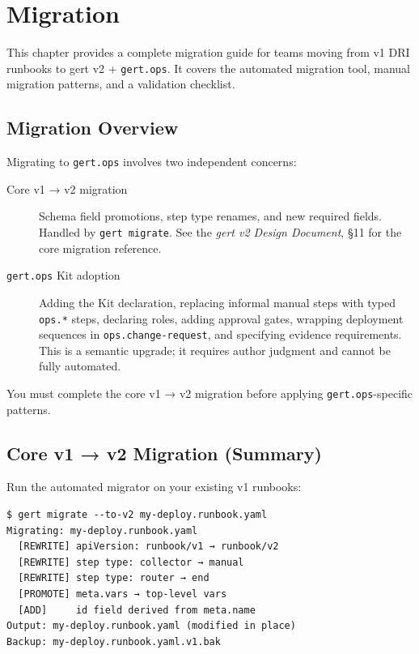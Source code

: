 \chapter{Migration}
\label{ch:migration}

This chapter provides a complete migration guide for teams moving from v1 DRI runbooks to
gert v2 + \texttt{gert.ops}. It covers the automated migration tool, manual migration
patterns, and a validation checklist.

\section{Migration Overview}
\label{sec:migration-overview}

Migrating to \texttt{gert.ops} involves two independent concerns:

\begin{description}
  \item[Core v1 → v2 migration] Schema field promotions, step type renames, and new required
    fields. Handled by \texttt{gert migrate}. See the \emph{gert v2 Design Document}, §11 for
    the core migration reference.
  \item[\texttt{gert.ops} Kit adoption] Adding the Kit declaration, replacing informal manual
    steps with typed \texttt{ops.*} steps, declaring roles, adding approval gates, wrapping
    deployment sequences in \texttt{ops.change-request}, and specifying evidence requirements.
    This is a semantic upgrade; it requires author judgment and cannot be fully automated.
\end{description}

You must complete the core v1 → v2 migration before applying \texttt{gert.ops}-specific
patterns.

\section{Core v1 → v2 Migration (Summary)}
\label{sec:migration-v1-to-v2}

Run the automated migrator on your existing v1 runbooks:

\begin{verbatim}
$ gert migrate --to-v2 my-deploy.runbook.yaml
Migrating: my-deploy.runbook.yaml
  [REWRITE] apiVersion: runbook/v1 → runbook/v2
  [REWRITE] step type: collector → manual
  [REWRITE] step type: router → end
  [PROMOTE] meta.vars → top-level vars
  [ADD]     id field derived from meta.name
Output: my-deploy.runbook.yaml (modified in place)
Backup: my-deploy.runbook.yaml.v1.bak
\end{verbatim}

